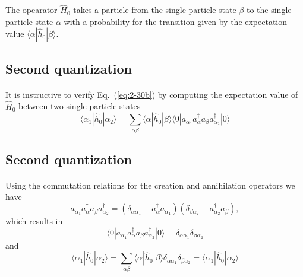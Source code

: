 \documentclass[%
twoside,                 %
final,                   %
10pt]{article}
\begin{document}
The opearator $\hat{H}_0$ takes a particle from the single-particle state $\beta$  to the single-particle state $\alpha$ 
with a probability for the transition given by the expectation value $\langle \alpha|\hat{h}_0|\beta\rangle$.




\subsection*{Second quantization}

\paragraph{}
It is instructive to verify Eq.~(\ref{eq:2-30b}) by computing the expectation value of $\hat{H}_0$ 
between two single-particle states
\begin{equation}
	\langle \alpha_1|\hat{h}_0|\alpha_2\rangle = \sum_{\alpha\beta} \langle \alpha|\hat{h}_0|\beta\rangle
		\langle 0|a_{\alpha_1}a_\alpha^{\dagger} a_\beta a_{\alpha_2}^{\dagger}|0\rangle \label{eq:2-30c}
\end{equation}





\subsection*{Second quantization}

\paragraph{}
Using the commutation relations for the creation and annihilation operators we have 
\begin{equation}
a_{\alpha_1}a_\alpha^{\dagger} a_\beta a_{\alpha_2}^{\dagger} = (\delta_{\alpha \alpha_1} - a_\alpha^{\dagger} a_{\alpha_1} )(\delta_{\beta \alpha_2} - a_{\alpha_2}^{\dagger} a_{\beta} ), \label{eq:2-30d}
\end{equation}
which results in
\begin{equation}
\langle 0|a_{\alpha_1}a_\alpha^{\dagger} a_\beta a_{\alpha_2}^{\dagger}|0\rangle = \delta_{\alpha \alpha_1} \delta_{\beta \alpha_2} \label{eq:2-30e}
\end{equation}
and
\begin{equation}
\langle \alpha_1|\hat{h}_0|\alpha_2\rangle = \sum_{\alpha\beta} \langle \alpha|\hat{h}_0|\beta\rangle\delta_{\alpha \alpha_1} \delta_{\beta \alpha_2} = \langle \alpha_1|\hat{h}_0|\alpha_2\rangle \label{eq:2-30f}
\end{equation}
\end{document}
